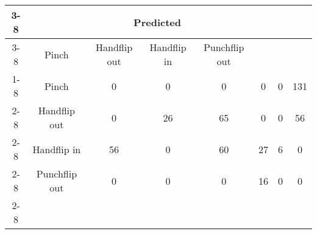 \documentclass{standalone}
\begin{document}
 
 \begin{tabular}{|c |c |c |c |c |c |c |c |}
\cline{3-8}\multicolumn{2}{c|}{} & \multicolumn{6}{c|}{Predicted} \\ 
\cline{3-8} \multicolumn{2}{c |}{ } & Pinch & Handflip out & Handflip in & Punchflip out\\ 
\cline{1-8}\multirow{6}{*}{\rotatebox[origin=c]{90}{Actual}} & Pinch & 0 & 0 & 0 & 0 & 0 & 131\\ 
 \cline{2-8} & Handflip out & 0 & 26 & 65 & 0 & 0 & 56\\ 
 \cline{2-8} & Handflip in & 56 & 0 & 60 & 27 & 6 & 0\\ 
 \cline{2-8} & Punchflip out & 0 & 0 & 0 & 16 & 0 & 0\\ 
 \cline{2-8}\hline \end{tabular}
 
\end{document}
